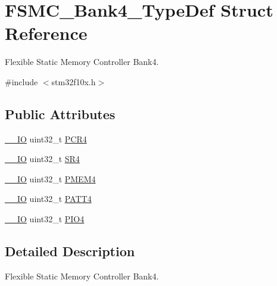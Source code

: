 \hypertarget{struct_f_s_m_c___bank4___type_def}{\section{F\-S\-M\-C\-\_\-\-Bank4\-\_\-\-Type\-Def Struct Reference}
\label{struct_f_s_m_c___bank4___type_def}
}


Flexible Static Memory Controller Bank4.  




{\ttfamily \#include $<$stm32f10x.\-h$>$}

\subsection*{Public Attributes}
\begin{DoxyCompactItemize}
\item 
\hyperlink{group___c_m_s_i_s__core__definitions_gaec43007d9998a0a0e01faede4133d6be}{\-\_\-\-\_\-\-I\-O} uint32\-\_\-t \hyperlink{struct_f_s_m_c___bank4___type_def_a0470b5bbb53e9f1bbde09829371eb72f}{P\-C\-R4}
\item 
\hyperlink{group___c_m_s_i_s__core__definitions_gaec43007d9998a0a0e01faede4133d6be}{\-\_\-\-\_\-\-I\-O} uint32\-\_\-t \hyperlink{struct_f_s_m_c___bank4___type_def_a1e0f09be7fa48bb7b14233866da1dd9f}{S\-R4}
\item 
\hyperlink{group___c_m_s_i_s__core__definitions_gaec43007d9998a0a0e01faede4133d6be}{\-\_\-\-\_\-\-I\-O} uint32\-\_\-t \hyperlink{struct_f_s_m_c___bank4___type_def_a4ed4ce751e7a8b3207bd20675b1d9085}{P\-M\-E\-M4}
\item 
\hyperlink{group___c_m_s_i_s__core__definitions_gaec43007d9998a0a0e01faede4133d6be}{\-\_\-\-\_\-\-I\-O} uint32\-\_\-t \hyperlink{struct_f_s_m_c___bank4___type_def_a4cccc7802b573135311cc38e7f247ff5}{P\-A\-T\-T4}
\item 
\hyperlink{group___c_m_s_i_s__core__definitions_gaec43007d9998a0a0e01faede4133d6be}{\-\_\-\-\_\-\-I\-O} uint32\-\_\-t \hyperlink{struct_f_s_m_c___bank4___type_def_a531ebc38c47bebfb198eafb4de24cb2a}{P\-I\-O4}
\end{DoxyCompactItemize}


\subsection{Detailed Description}
Flexible Static Memory Controller Bank4. 

